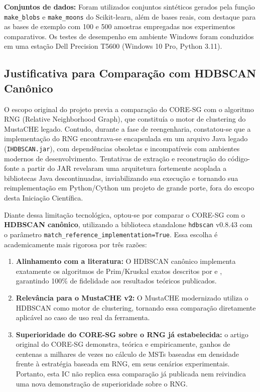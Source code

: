 \documentclass[12pt,a4paper,oneside]{article}
\let\cite\citep
\newcommand{\textcite}{\citet}
\begin{document}
\textbf{Conjuntos de dados:} Foram utilizados conjuntos sintéticos gerados pela função
\texttt{make\_blobs} e \texttt{make\_moons} do Scikit-learn, além de bases reais, com destaque
para as bases de exemplo com 100 e 500 amostras empregadas nos experimentos comparativos.
Os testes de desempenho em ambiente Windows foram conduzidos em uma estação Dell Precision
T5600 (Windows 10 Pro, Python 3.11).

\subsection{Justificativa para Comparação com HDBSCAN Canônico}

O escopo original do projeto previa a comparação do CORE-SG com o algoritmo RNG (Relative
Neighborhood Graph), que constituía o motor de clustering do MustaCHE legado. Contudo, durante
a fase de reengenharia, constatou-se que a implementação do RNG encontrava-se encapsulada em um
arquivo Java legado (\texttt{IHDBSCAN.jar}), com dependências obsoletas e incompatíveis com
ambientes modernos de desenvolvimento. Tentativas de extração e reconstrução do código-fonte
a partir do JAR revelaram uma arquitetura fortemente acoplada a bibliotecas Java descontinuadas,
inviabilizando sua execução e tornando sua reimplementação em Python/Cython um projeto de
grande porte, fora do escopo desta Iniciação Científica.

Diante dessa limitação tecnológica, optou-se por comparar o CORE-SG com o \textbf{HDBSCAN
canônico}, utilizando a biblioteca standalone \texttt{hdbscan} v0.8.43 com o parâmetro
\texttt{match\_reference\_implementation=True}. Essa escolha é academicamente mais rigorosa por
três razões:

\begin{enumerate}
  \item \textbf{Alinhamento com a literatura:} O HDBSCAN canônico implementa exatamente os
        algoritmos de Prim/Kruskal exatos descritos por \textcite{campello2013framework} e
        \textcite{campello2015hierarchical}, garantindo 100\% de fidelidade aos resultados
        teóricos publicados.
  \item \textbf{Relevância para o MustaCHE v2:} O MustaCHE modernizado utiliza o HDBSCAN como
        motor de clustering, tornando essa comparação diretamente aplicável ao caso de uso real
        da ferramenta.
  \item \textbf{Superioridade do CORE-SG sobre o RNG já estabelecida:} o artigo original do
        CORE-SG \cite{naldi2022coresg} demonstra, teórica e empiricamente, ganhos de centenas
        a milhares de vezes no cálculo de MSTs baseadas em densidade frente à estratégia baseada
        em RNG, em seus cenários experimentais. Portanto, esta IC não replica essa comparação
        já publicada nem reivindica uma nova demonstração de superioridade sobre o RNG.
\end{enumerate}
\end{document}
